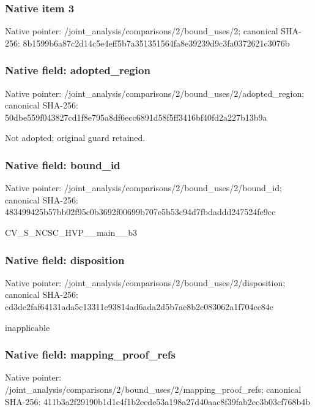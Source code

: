 \documentclass[10pt,a4paper]{article}
\begin{document}
\subsubsection{Native item 3}
Native pointer: /joint\_\allowbreak{}analysis/comparisons/2/bound\_\allowbreak{}uses/2; canonical SHA-256: 8b1599b6a87c2d14c5e4eff5b7a351351564fa8e39239d9c3fa0372621c3076b

\subsubsection{Native field: adopted\_\allowbreak{}region}
Native pointer: /joint\_\allowbreak{}analysis/comparisons/2/bound\_\allowbreak{}uses/2/adopted\_\allowbreak{}region; canonical SHA-256: 50dbe559f043827cd1f8e795a8df6ecc6891d58f5ff3416bf40fd2a227b13b9a

\begingroup\raggedright\sloppy Not adopted;\allowbreak{} original guard retained.\par\endgroup

\subsubsection{Native field: bound\_\allowbreak{}id}
Native pointer: /joint\_\allowbreak{}analysis/comparisons/2/bound\_\allowbreak{}uses/2/bound\_\allowbreak{}id; canonical SHA-256: 483499425b57bb02f95c0b3692f00699b707e5b53c94d7fbdaddd247524fe9cc

\begingroup\raggedright\sloppy CV\_\allowbreak{}S\_\allowbreak{}NCSC\_\allowbreak{}HVP\_\allowbreak{}\_\allowbreak{}main\_\allowbreak{}\_\allowbreak{}b3\par\endgroup

\subsubsection{Native field: disposition}
Native pointer: /joint\_\allowbreak{}analysis/comparisons/2/bound\_\allowbreak{}uses/2/disposition; canonical SHA-256: cd3dc2faf64131ada5c13311e93814ad6ada2d5b7ae8b2c083062a1f704cc84e

\begingroup\raggedright\sloppy inapplicable\par\endgroup

\subsubsection{Native field: mapping\_\allowbreak{}proof\_\allowbreak{}refs}
Native pointer: /joint\_\allowbreak{}analysis/comparisons/2/bound\_\allowbreak{}uses/2/mapping\_\allowbreak{}proof\_\allowbreak{}refs; canonical SHA-256: 411b3a2f29190b1d1c4f1b2eede53a198a27d40aac8f39fab2ec3b03cf768b4b
\end{document}
